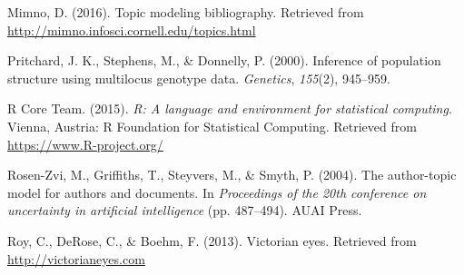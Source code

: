 \documentclass[12pt,]{article}
\begin{document}
\hypertarget{ref-mimno2016topic}{}
Mimno, D. (2016). Topic modeling bibliography. Retrieved from
\url{http://mimno.infosci.cornell.edu/topics.html}

\hypertarget{ref-pritchard2000inference}{}
Pritchard, J. K., Stephens, M., \& Donnelly, P. (2000). Inference of
population structure using multilocus genotype data. \emph{Genetics},
\emph{155}(2), 945--959.

\hypertarget{ref-r2015}{}
R Core Team. (2015). \emph{R: A language and environment for statistical
computing}. Vienna, Austria: R Foundation for Statistical Computing.
Retrieved from \url{https://www.R-project.org/}

\hypertarget{ref-rosen2004author}{}
Rosen-Zvi, M., Griffiths, T., Steyvers, M., \& Smyth, P. (2004). The
author-topic model for authors and documents. In \emph{Proceedings of
the 20th conference on uncertainty in artificial intelligence} (pp.
487--494). AUAI Press.

\hypertarget{ref-roy2013victorian}{}
Roy, C., DeRose, C., \& Boehm, F. (2013). Victorian eyes. Retrieved from
\url{http://victorianeyes.com}
\end{document}
